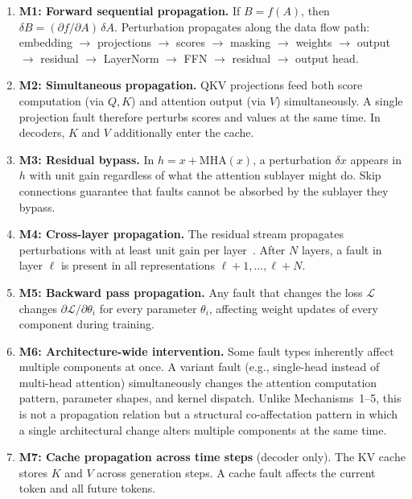 \begin{enumerate}[nosep]
\item \textbf{M1: Forward sequential propagation.} If $B = f(A)$, then $\delta B = (\partial f / \partial A)\, \delta A$. Perturbation propagates along the data flow path: embedding $\to$ projections $\to$ scores $\to$ masking $\to$ weights $\to$ output $\to$ residual $\to$ LayerNorm $\to$ FFN $\to$ residual $\to$ output head.

\item \textbf{M2: Simultaneous propagation.} QKV projections feed both score computation (via $Q, K$) and attention output (via $V$) simultaneously. A single projection fault therefore perturbs scores and values at the same time. In decoders, $K$ and $V$ additionally enter the cache.

\item \textbf{M3: Residual bypass.} In $h = x + \text{MHA}(x)$, a perturbation $\delta x$ appears in $h$ with unit gain regardless of what the attention sublayer might do. Skip connections guarantee that faults cannot be absorbed by the sublayer they bypass.

\item \textbf{M4: Cross-layer propagation.} The residual stream propagates perturbations with at least unit gain per layer~\cite{roquet2024cross}. After $N$ layers, a fault in layer $\ell$ is present in all representations $\ell+1, \ldots, \ell+N$.

\item \textbf{M5: Backward pass propagation.} Any fault that changes the loss $\mathcal{L}$ changes $\partial \mathcal{L} / \partial \theta_i$ for every parameter $\theta_i$, affecting weight updates of every component during training.

\item \textbf{M6: Architecture-wide intervention.} Some fault types inherently affect multiple components at once. A variant fault (e.g., single-head instead of multi-head attention) simultaneously changes the attention computation pattern, parameter shapes, and kernel dispatch. Unlike Mechanisms~1--5, this is not a propagation relation but a structural co-affectation pattern in which a single architectural change alters multiple components at the same time.

\item \textbf{M7: Cache propagation across time steps} (decoder only). The KV cache stores $K$ and $V$ across generation steps. A cache fault affects the current token and all future tokens.
\end{enumerate}

